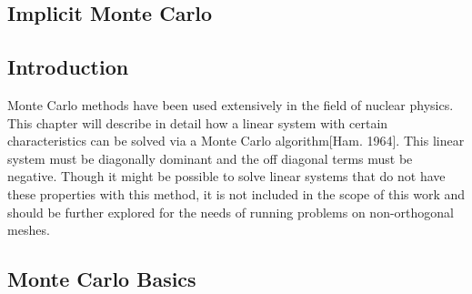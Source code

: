 
\begin{center}
\section{Implicit Monte Carlo}
\label{sec:MonteCarlo}
\end{center}

\aboveSubSecSkip

\subsection{Introduction}
\label{sec:MonteCarlo-Intro}

\noindent
	\indent Monte Carlo methods have been used extensively in the field of nuclear physics. This chapter will describe in detail how a linear system  with certain characteristics can be solved via a Monte Carlo algorithm[Ham. 1964]. This linear system must be diagonally dominant and the off diagonal terms must be negative. Though it might be possible to solve linear systems that do not have these properties with this method, it is not included in the scope of this work and should be further explored for the needs of running problems on non-orthogonal meshes.
			
\belowSubSecSkip

\aboveSubSecSkip

\subsection{Monte Carlo Basics}
\label{sec:MonteCarlo-MC}

